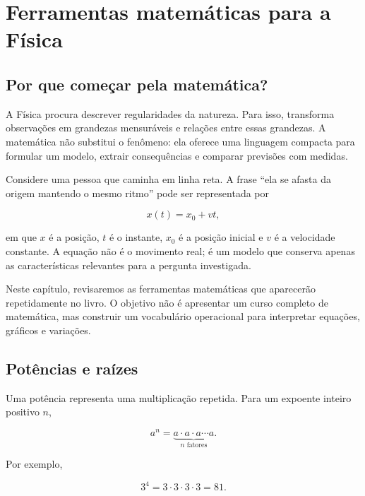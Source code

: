 \chapter{Ferramentas matemáticas para a Física}
\label{cap:ferramentas-matematicas}

\section{Por que começar pela matemática?}

A Física procura descrever regularidades da natureza. Para isso, transforma observações em grandezas mensuráveis e relações entre essas grandezas. A matemática não substitui o fenômeno: ela oferece uma linguagem compacta para formular um modelo, extrair consequências e comparar previsões com medidas.

Considere uma pessoa que caminha em linha reta. A frase ``ela se afasta da origem mantendo o mesmo ritmo'' pode ser representada por

\begin{equation}
  x(t)=x_0+vt,
  \label{eq:posicao-mu}
\end{equation}

em que $x$ é a posição, $t$ é o instante, $x_0$ é a posição inicial e $v$ é a velocidade constante. A equação não é o movimento real; é um modelo que conserva apenas as características relevantes para a pergunta investigada.

Neste capítulo, revisaremos as ferramentas matemáticas que aparecerão repetidamente no livro. O objetivo não é apresentar um curso completo de matemática, mas construir um vocabulário operacional para interpretar equações, gráficos e variações.

\section{Potências e raízes}

Uma potência representa uma multiplicação repetida. Para um expoente inteiro positivo $n$,

\begin{equation}
  a^n=\underbrace{a\cdot a\cdot a\cdots a}_{n\text{ fatores}}.
\end{equation}

Por exemplo,

\begin{equation}
  3^4=3\cdot3\cdot3\cdot3=81.
\end{equation}

